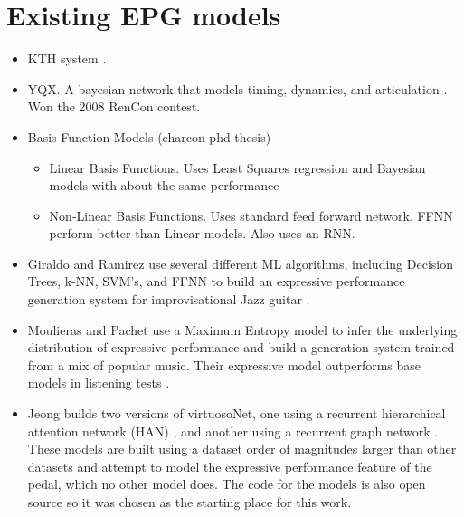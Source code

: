 \section{Existing EPG models}
\begin{itemize}
    \item KTH system \cite{friberg2006overview}. 
    \item YQX. A bayesian network that models timing, dynamics, and articulation \cite{widmer2009yqx}. Won the 2008 RenCon contest. 
    \item Basis Function Models \cite{eduardo2018computational} (charcon phd thesis)
    \begin{itemize}
        \item Linear Basis Functions. Uses Least Squares regression and Bayesian models with about the same performance
        \item Non-Linear Basis Functions. Uses standard feed forward network. FFNN perform better than Linear models. Also uses an RNN. 
    \end{itemize}
    \item Giraldo and Ramirez use several different ML algorithms, including Decision Trees, k-NN, SVM's, and FFNN to build an expressive performance generation system for improvisational Jazz guitar \cite{giraldo2016machine}. 
    \item Moulieras and Pachet use a Maximum Entropy model to infer the underlying distribution of expressive performance and build a generation system trained from a mix of popular music. Their expressive model outperforms base models in listening tests \cite{moulieras2016maximum}. 
    \item Jeong builds two versions of virtuosoNet, one using a recurrent hierarchical attention network (HAN) \cite{jeong2019virtuosonet}, and another using a recurrent graph network \cite{jeong2019graph}. These models are built using a dataset order of magnitudes larger than other datasets and attempt to model the expressive performance feature of the pedal, which no other model does. The code for the models is also open source so it was chosen as the starting place for this work. 
\end{itemize}

